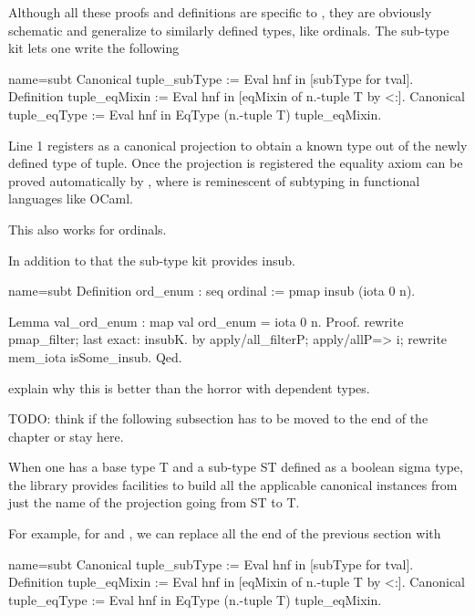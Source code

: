 Although all these proofs and definitions are specific to ,
they are obviously schematic and generalize to similarly defined types,
like ordinals.  The sub-type kit lets one write the following

\begin{coq}{name=subt}{}
Canonical tuple_subType := Eval hnf in [subType for tval].
Definition tuple_eqMixin := Eval hnf in [eqMixin of n.-tuple T by <:].
Canonical tuple_eqType := Eval hnf in EqType (n.-tuple T) tuple_eqMixin.
\end{coq}

Line 1 registers  as a canonical projection to obtain a known
type out of the newly defined type of tuple.  Once the projection
is registered the equality axiom can be proved automatically by
, where \C{<:} is reminescent of
subtyping in functional languages like OCaml.

This also works for ordinals.

In addition to that the sub-type kit provides insub.

\begin{coq}{name=subt}{}
Definition ord_enum : seq ordinal := pmap insub (iota 0 n).

Lemma val_ord_enum : map val ord_enum = iota 0 n.
Proof.
rewrite pmap_filter; last exact: insubK.
by apply/all_filterP; apply/allP=> i; rewrite mem_iota isSome_insub.
Qed.
\end{coq}

explain why this is better than the horror with dependent types.

TODO: think if the following subsection has to be moved to the end
of the chapter or stay here.

\mcbREQUIRE{}

When one has a base type T and a sub-type ST defined as a boolean
sigma type, the \mcbMC{} library provides facilities to
build all the applicable canonical instances from just
the name of the projection going from ST to T.

For example, for  and , we can replace all the end of the
previous section with

\begin{coq}{name=subt}{}
Canonical tuple_subType := Eval hnf in [subType for tval].
Definition tuple_eqMixin := Eval hnf in [eqMixin of n.-tuple T by <:].
Canonical tuple_eqType := Eval hnf in EqType (n.-tuple T) tuple_eqMixin.
\end{coq}

